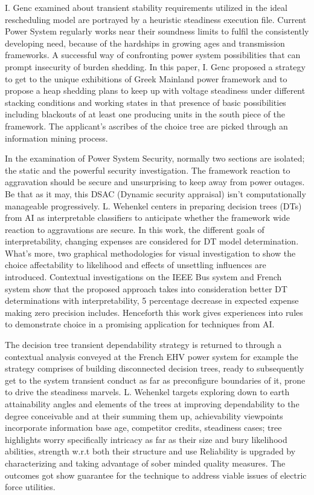 I. Genc \cite{L3} examined about transient stability requirements utilized in the ideal rescheduling model are portrayed by a heuristic steadiness execution file. Current Power System regularly works near their soundness limits to fulfil the consistently developing need, because of the hardships in growing ages and transmission frameworks. A successful way of confronting power system possibilities that can prompt insecurity of burden shedding. In this paper, I. Genc proposed a strategy to get to the unique exhibitions of Greek Mainland power framework and to propose a heap shedding plans to keep up with voltage steadiness under different stacking conditions and working states in that presence of basic possibilities including blackouts of at least one producing units in the south piece of the framework. The applicant's ascribes of the choice tree are picked through an information mining process. 

In the examination of Power System Security, normally two sections are isolated; the static and the powerful security investigation. The framework reaction to aggravation should be secure and unsurprising to keep away from power outages. Be that as it may, this DSAC (Dynamic security appraisal) isn't computationally manageable progressively. L. Wehenkel \cite{L4} centers in preparing decision trees (DTs) from AI as interpretable classifiers to anticipate whether the framework wide reaction to aggravations are secure. In this work, the different goals of interpretability, changing expenses are considered for DT model determination. What's more, two graphical methodologies for visual investigation to show the choice affectability to likelihood and effects of unsettling influences are introduced. Contextual investigations on the IEEE Bus system and French system show that the proposed approach takes into consideration better DT determinations with interpretability, 5 percentage decrease in expected expense making zero precision includes. Henceforth this work gives experiences into rules to demonstrate choice in a promising application for techniques from AI. 

The decision tree transient dependability strategy is returned to through a contextual analysis conveyed at the French EHV power system for example the strategy comprises of building disconnected decision trees, ready to subsequently get to the system transient conduct as far as preconfigure boundaries of it, prone to drive the steadiness marvels. L. Wehenkel \cite{L5} targets exploring down to earth attainability angles and elements of the trees at improving dependability to the degree conceivable and at their summing them up, achievability viewpoints incorporate information base age, competitor credits, steadiness cases; tree highlights worry specifically intricacy as far as their size and bury likelihood abilities, strength w.r.t both their structure and use Reliability is upgraded by characterizing and taking advantage of sober minded quality measures. The outcomes got show guarantee for the technique to address viable issues of electric force utilities.

